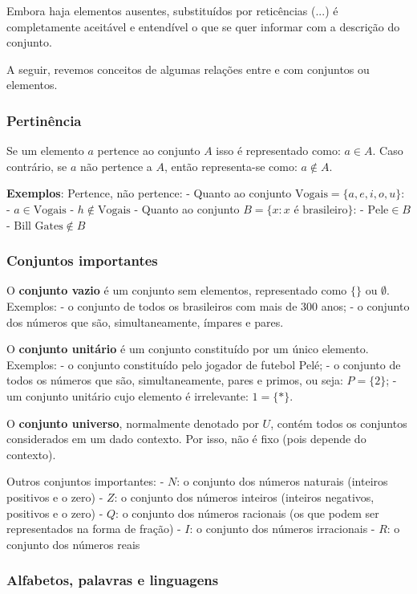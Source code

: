 \documentclass{article}
\begin{document}
Embora haja elementos ausentes, substituídos por reticências (\(...\)) é
completamente aceitável e entendível o que se quer informar com a
descrição do conjunto.

A seguir, revemos conceitos de algumas relações entre e com conjuntos ou
elementos.


    \subsubsection{Pertinência}


    Se um elemento \(a\) pertence ao conjunto \(A\) isso é representado
como: \(a \in A\). Caso contrário, se \(a\) não pertence a \(A\), então
representa-se como: \(a \not\in A\).

\textbf{Exemplos}: Pertence, não pertence: - Quanto ao conjunto
\(\mbox{Vogais} = \{a, e, i, o, u\}\): - \(a \in \mbox{Vogais}\) -
\(h \not\in \mbox{Vogais}\) - Quanto ao conjunto
\(B = \{x : x \mbox{ é brasileiro}\}\): - \(\mbox{Pele} \in B\) -
\(\mbox{Bill Gates} \not\in B\)


    \subsubsection{Conjuntos importantes}


    O \textbf{conjunto vazio} é um conjunto sem elementos, representado como
\(\{\}\) ou \(\emptyset\). Exemplos: - o conjunto de todos os
brasileiros com mais de 300 anos; - o conjunto dos números que são,
simultaneamente, ímpares e pares.

O \textbf{conjunto unitário} é um conjunto constituído por um único
elemento. Exemplos: - o conjunto constituído pelo jogador de futebol
Pelé; - o conjunto de todos os números que são, simultaneamente, pares e
primos, ou seja: \(P = \{2\}\); - um conjunto unitário cujo elemento é
irrelevante: \(1 = \{*\}\).

O \textbf{conjunto universo}, normalmente denotado por \(U\), contém
todos os conjuntos considerados em um dado contexto. Por isso, não é
fixo (pois depende do contexto).

Outros conjuntos importantes: - \(N\): o conjunto dos números naturais
(inteiros positivos e o zero) - \(Z\): o conjunto dos números inteiros
(inteiros negativos, positivos e o zero) - \(Q\): o conjunto dos números
racionais (os que podem ser representados na forma de fração) - \(I\): o
conjunto dos números irracionais - \(R\): o conjunto dos números reais


    \subsubsection{Alfabetos, palavras e linguagens}
\end{document}
